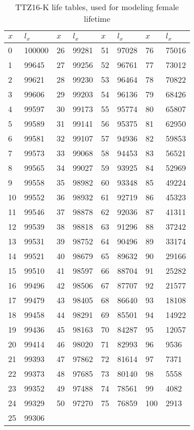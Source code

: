 \documentclass[11pt,wide]{mwart}
\begin{document}
\begin{table}[!htbp]
	\centering
	\label{ttz_k}
	\caption{TTZ16-K life tables, used for modeling female lifetime}
	\begin{tabular}{|l|l|l|l|l|l|l|l|}
		\hline
		$x$ & $l_x$  & $x$ & $l_x$ & $x$ & $l_x$ & $x$ & $l_x$ \\ \hline
		0   & 100000 & 26  & 99281 & 51  & 97028 & 76  & 75016 \\ \hline
		1   & 99645  & 27  & 99256 & 52  & 96761 & 77  & 73012 \\ \hline
		2   & 99621  & 28  & 99230 & 53  & 96464 & 78  & 70822 \\ \hline
		3   & 99606  & 29  & 99203 & 54  & 96136 & 79  & 68426 \\ \hline
		4   & 99597  & 30  & 99173 & 55  & 95774 & 80  & 65807 \\ \hline
		5   & 99589  & 31  & 99141 & 56  & 95375 & 81  & 62950 \\ \hline
		6   & 99581  & 32  & 99107 & 57  & 94936 & 82  & 59853 \\ \hline
		7   & 99573  & 33  & 99068 & 58  & 94453 & 83  & 56521 \\ \hline
		8   & 99565  & 34  & 99027 & 59  & 93925 & 84  & 52969 \\ \hline
		9   & 99558  & 35  & 98982 & 60  & 93348 & 85  & 49224 \\ \hline
		10  & 99552  & 36  & 98932 & 61  & 92719 & 86  & 45323 \\ \hline
		11  & 99546  & 37  & 98878 & 62  & 92036 & 87  & 41311 \\ \hline
		12  & 99539  & 38  & 98818 & 63  & 91296 & 88  & 37242 \\ \hline
		13  & 99531  & 39  & 98752 & 64  & 90496 & 89  & 33174 \\ \hline
		14  & 99521  & 40  & 98679 & 65  & 89632 & 90  & 29166 \\ \hline
		15  & 99510  & 41  & 98597 & 66  & 88704 & 91  & 25282 \\ \hline
		16  & 99496  & 42  & 98506 & 67  & 87707 & 92  & 21577 \\ \hline
		17  & 99479  & 43  & 98405 & 68  & 86640 & 93  & 18108 \\ \hline
		18  & 99458  & 44  & 98291 & 69  & 85501 & 94  & 14922 \\ \hline
		19  & 99436  & 45  & 98163 & 70  & 84287 & 95  & 12057 \\ \hline
		20  & 99414  & 46  & 98020 & 71  & 82993 & 96  & 9536  \\ \hline
		21  & 99393  & 47  & 97862 & 72  & 81614 & 97  & 7371  \\ \hline
		22  & 99373  & 48  & 97685 & 73  & 80140 & 98  & 5558  \\ \hline
		23  & 99352  & 49  & 97488 & 74  & 78561 & 99  & 4082  \\ \hline
		24  & 99329  & 50  & 97270 & 75  & 76859 & 100 & 2913  \\ \hline
		25  & 99306  &     &       &     &       &     &       \\ \hline
	\end{tabular}
\end{table}

\newpage
\end{document}

